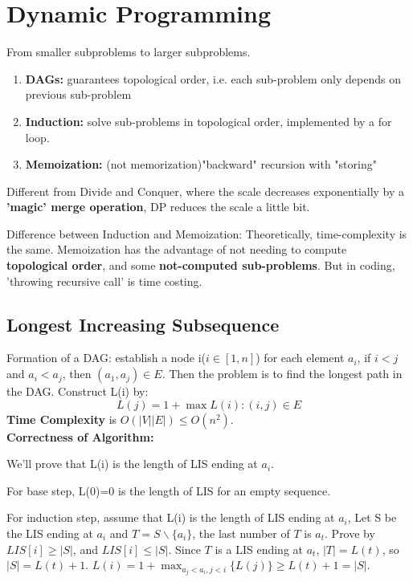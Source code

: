 \section{Dynamic Programming}
From smaller subproblems to larger subproblems. 
\begin{enumerate}[-]
    \item \textbf{DAGs:} guarantees topological order, i.e. each  sub-problem only depends on previous sub-problem
    \item \textbf{Induction:} solve sub-problems in topological order, implemented by a for loop.
    \item \textbf{Memoization:} (not memorization)"backward" recursion with "storing"
\end{enumerate}

Different from Divide and Conquer, where the scale decreases exponentially by a \textbf{'magic' merge operation}, 
DP reduces the scale a little bit.

Difference between Induction and Memoization: Theoretically, time-complexity is the same. 
Memoization has the advantage of not needing to compute \textbf{topological order}, and some \textbf{not-computed sub-problems}.
But in coding, 'throwing recursive call' is time costing.


\subsection{Longest Increasing Subsequence}
Formation of a DAG: establish a node i($i\in [1,n]$) for each element $a_i$, if $i<j$ and $a_i<a_j$, then $(a_1,a_j)\in E$.
Then the problem is to find the longest path in the DAG.
Construct L(i) by:
\[
    L(j)=1+\max{L(i):(i,j)\in E}\]
\textbf{Time Complexity} is $O(|V||E|)\leq O(n^2)$.\\
\textbf{Correctness of Algorithm:} 

We'll prove that L(i) is the length of LIS ending at $a_i$.

For base step, L(0)=0 is the length of LIS for an empty sequence.

For induction step, assume that L(i) is the length of LIS ending at $a_i$, 
Let S be the LIS ending at $a_i$ and $T=S\backslash \{a_i\}$, the last number of $T$ is $a_t$.
Prove by $LIS[i]\geq |S|$, and $LIS[i]\leq |S|$.
Since $T$ is a LIS ending at $a_t$, $|T|=L(t)$, so $|S|=L(t)+1$. $L(i)=1+\max_{a_j<a_i,j<i}\{L(j)\}\geq L(t)+1=|S|$.

